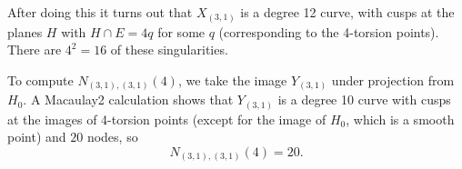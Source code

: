 \documentclass[thesis]{thesis-umich}           %
\theoremstyle{definition}
\begin{document}
After doing this it turns out that $X_{(3,1)}$ is a degree 12 curve, with cusps at the planes $H$ with $H\cap E=4q$ for some $q$ (corresponding to the 4-torsion points). There are $4^2=16$ of these singularities.

To compute $N_{(3,1),(3,1)}(4)$, we take the image $Y_{(3,1)}$ under projection from $H_0$. A Macaulay2 calculation shows that $Y_{(3,1)}$ is a degree 10
curve with cusps at the images of 4-torsion points (except for the image of $H_0$, which is a smooth point) and $20$ nodes, so
\[
N_{(3,1),(3,1)}(4)=20.
\]





\printbibliography[heading=bibintoc, title={References}]
\end{document}
